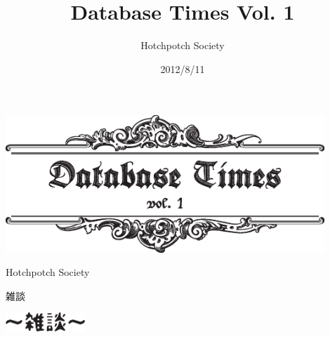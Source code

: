 \documentclass[b5paper,papersize,tombow,11pt]{jsbook}
\title{Database Times Vol. 1}
\date{2012/8/11}
\author{Hotchpotch Society}
\begin{document}
\thispagestyle{empty}

\frontmatter

\begin{center}
 \includegraphics[width=12cm]{hayamiz/images/title.eps}
 \par\vspace*{50mm}
 \noindent Hotchpotch Society
\end{center}



\setcounter{tocdepth}{0} %
\tableofcontents

\mainmatter

\pagestyle{fancy}


% 








\cleardoublepage
\plainifnotempty
{}
{\protect 雑談}

\begin{center}
 \includegraphics[width=3cm]{images/zatsudan.eps}
\end{center}

%
%

\footnotesize
\end{document}
